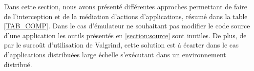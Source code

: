Dans cette section, nous avons présenté différentes approches permettant de faire de l'interception et de la médiation d'actions d'applications, résumé dans la table \ref{TAB_COMP}. Dans le cas d'émulateur ne souhaitant pas modifier le code source d'une application les outils présentés en \ref{section:source} sont inutiles. De plus, de par le surcoût d'utilisation de Valgrind, cette solution est à écarter dans le cas d'applications distribuées large échelle s'exécutant dans un environnement distribué.

\begin{table}[h]
\caption{Comparaison des différentes solutions d'interception entre une
  application et le noyau}
\label{TAB_COMP}
\end{table}
